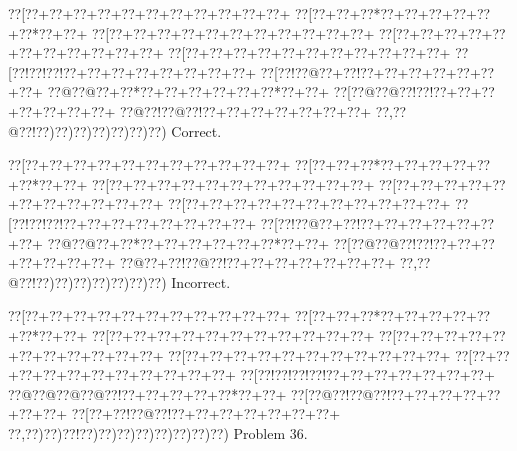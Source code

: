 \documentclass[a5paper]{article}
\begin{document}
\begin{center}
{\goo
\0??[\0??+\0??+\0??+\0??+\0??+\0??+\0??+\0??+\0??+\0??+\0??+
\0??[\0??+\0??+\0??*\0??+\0??+\0??+\0??+\0??+\0??*\0??+\0??+
\0??[\0??+\0??+\0??+\0??+\0??+\0??+\0??+\0??+\0??+\0??+\0??+
\0??[\0??+\0??+\0??+\0??+\0??+\0??+\0??+\0??+\0??+\0??+\0??+
\0??[\0??+\0??+\0??+\0??+\0??+\0??+\0??+\0??+\0??+\0??+\0??+
\0??[\0??!\0??!\0??!\0??+\0??+\0??+\0??+\0??+\0??+\0??+\0??+
\0??[\0??!\0??@\0??+\0??!\0??+\0??+\0??+\0??+\0??+\0??+\0??+
\0??@\0??@\0??+\0??*\0??+\0??+\0??+\0??+\0??+\0??*\0??+\0??+
\0??[\0??@\0??@\0??!\0??!\0??+\0??+\0??+\0??+\0??+\0??+\0??+
\0??@\0??!\0??@\0??!\0??+\0??+\0??+\0??+\0??+\0??+\0??+
\0??,\0??@\0??!\0??)\0??)\0??)\0??)\0??)\0??)\0??)
}
Correct. 

\end{center}
\begin{center}
{\goo
\0??[\0??+\0??+\0??+\0??+\0??+\0??+\0??+\0??+\0??+\0??+\0??+
\0??[\0??+\0??+\0??*\0??+\0??+\0??+\0??+\0??+\0??*\0??+\0??+
\0??[\0??+\0??+\0??+\0??+\0??+\0??+\0??+\0??+\0??+\0??+\0??+
\0??[\0??+\0??+\0??+\0??+\0??+\0??+\0??+\0??+\0??+\0??+\0??+
\0??[\0??+\0??+\0??+\0??+\0??+\0??+\0??+\0??+\0??+\0??+\0??+
\0??[\0??!\0??!\0??!\0??+\0??+\0??+\0??+\0??+\0??+\0??+\0??+
\0??[\0??!\0??@\0??+\0??!\0??+\0??+\0??+\0??+\0??+\0??+\0??+
\0??@\0??@\0??+\0??*\0??+\0??+\0??+\0??+\0??+\0??*\0??+\0??+
\0??[\0??@\0??@\0??!\0??!\0??+\0??+\0??+\0??+\0??+\0??+\0??+
\0??@\0??+\0??!\0??@\0??!\0??+\0??+\0??+\0??+\0??+\0??+\0??+
\0??,\0??@\0??!\0??)\0??)\0??)\0??)\0??)\0??)\0??)
}
Incorrect. 

\end{center}
\newpage
\begin{center}
{\goo
\0??[\0??+\0??+\0??+\0??+\0??+\0??+\0??+\0??+\0??+\0??+\0??+
\0??[\0??+\0??+\0??*\0??+\0??+\0??+\0??+\0??+\0??*\0??+\0??+
\0??[\0??+\0??+\0??+\0??+\0??+\0??+\0??+\0??+\0??+\0??+\0??+
\0??[\0??+\0??+\0??+\0??+\0??+\0??+\0??+\0??+\0??+\0??+\0??+
\0??[\0??+\0??+\0??+\0??+\0??+\0??+\0??+\0??+\0??+\0??+\0??+
\0??[\0??+\0??+\0??+\0??+\0??+\0??+\0??+\0??+\0??+\0??+\0??+
\0??[\0??!\0??!\0??!\0??!\0??+\0??+\0??+\0??+\0??+\0??+\0??+
\0??@\0??@\0??@\0??@\0??!\0??+\0??+\0??+\0??+\0??*\0??+\0??+
\0??[\0??@\0??!\0??@\0??!\0??+\0??+\0??+\0??+\0??+\0??+\0??+
\0??[\0??+\0??!\0??@\0??!\0??+\0??+\0??+\0??+\0??+\0??+\0??+
\0??,\0??)\0??)\0??!\0??)\0??)\0??)\0??)\0??)\0??)\0??)\0??)
}
Problem 36.

\end{center}
\end{document}
